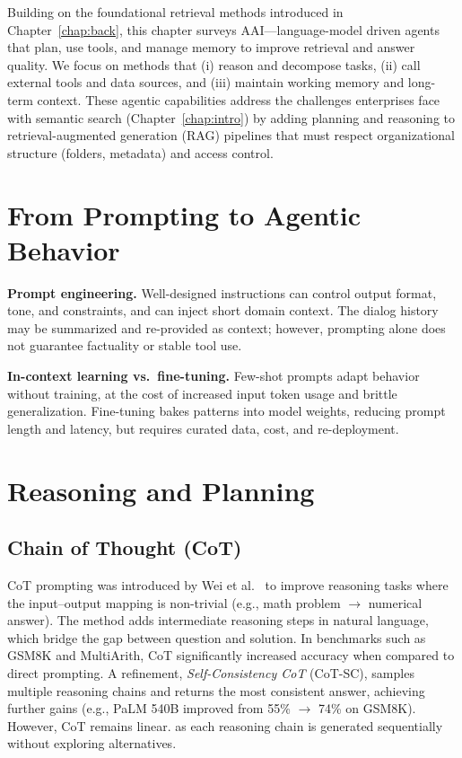 \label{chap:stateofart}
\cleardoublepage

Building on the foundational retrieval methods introduced in Chapter~\ref{chap:back}, this chapter surveys \gls{AAI}—language-model driven agents that plan, use tools, and manage memory to improve retrieval and answer quality. We focus on methods that (i) reason and decompose tasks, (ii) call external tools and data sources, and (iii) maintain working memory and long-term context. These agentic capabilities address the challenges enterprises face with semantic search (Chapter~\ref{chap:intro}) by adding planning and reasoning to retrieval-augmented generation (\gls{RAG}) pipelines that must respect organizational structure (folders, metadata) and access control.

\section{From Prompting to Agentic Behavior}
\textbf{Prompt engineering.} Well-designed instructions can control output format, tone, and constraints, and can inject short domain context.  The dialog history may be summarized and re-provided as context; however, prompting alone does not guarantee factuality or stable tool use.

\textbf{In-context learning vs.\ fine-tuning.} Few-shot prompts adapt behavior without training, at the cost of increased input token usage and brittle generalization. Fine-tuning bakes patterns into model weights, reducing prompt length and latency, but requires curated data, cost, and re-deployment.

\section{Reasoning and Planning}
\subsection{Chain of Thought (CoT)}
CoT prompting was introduced by Wei et al.~\cite{chainofthought} to improve reasoning tasks where the input–output mapping is non-trivial (e.g., math problem $\to$ numerical answer). The method adds intermediate reasoning steps in natural language, which bridge the gap between question and solution.
In benchmarks such as GSM8K and MultiArith, CoT significantly increased accuracy when compared to direct prompting. A refinement, \emph{Self-Consistency CoT} (CoT-SC), samples multiple reasoning chains and returns the most consistent answer, achieving further gains (e.g., PaLM 540B improved from 55\% $\to$ 74\% on GSM8K). However, CoT remains linear. as each reasoning chain is generated sequentially without exploring alternatives.

